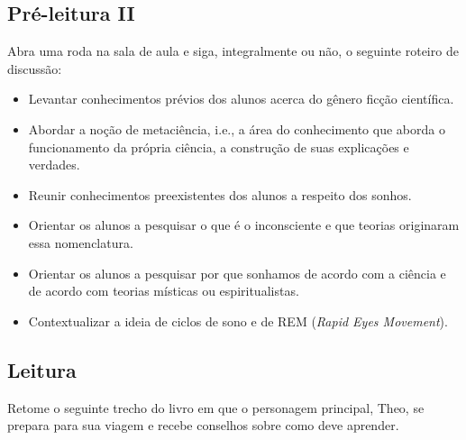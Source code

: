 \documentclass[12pt]{extarticle}
\begin{document}
\subsection{Pré-leitura II}
Abra uma roda na sala de aula e siga, integralmente ou não, o seguinte roteiro de discussão:

\begin{itemize}
\item Levantar conhecimentos prévios dos alunos acerca do gênero ficção
científica.

\item Abordar a noção de metaciência, i.e., a área do conhecimento que aborda o
funcionamento da própria ciência, a construção de suas explicações e verdades.

\item Reunir conhecimentos preexistentes dos alunos a respeito dos sonhos.

\item Orientar os alunos a pesquisar o que é o inconsciente e que teorias
originaram essa nomenclatura.

\item Orientar os alunos a pesquisar por que sonhamos de acordo com a ciência e de
acordo com teorias místicas ou espiritualistas.

\item Contextualizar a ideia de ciclos de sono e de REM (\textit{Rapid Eyes Movement}).


\end{itemize}

\subsection{Leitura}


Retome o seguinte trecho do livro em que o personagem principal, Theo, se
prepara para sua viagem e recebe conselhos sobre como deve aprender.  
\end{document}
